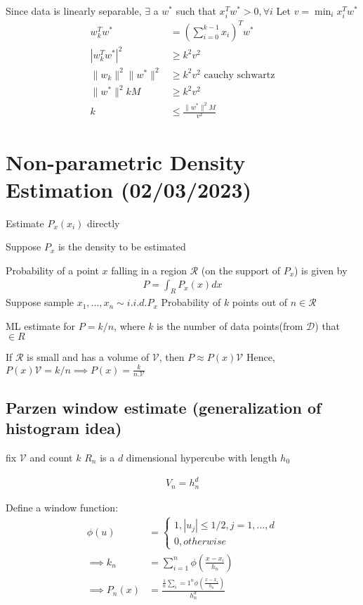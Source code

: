 \documentclass[11pt]{article}
\begin{document}
Since data is linearly separable, \(\exists\) a \(w^{*}\) such that \(x_i^Tw^{*} > 0, \forall i\)
Let \(v = \min_i x_i^T w^{*}\)
\begin{align*}
  w_k^T w^{*} &= \left( \sum_{i=0}^{k-1} x_i \right)^T w^{*} \\
  |w_k^T w^{*}|^2 &\geq k^2v^2 \\
  \lVert w_k \rVert^2 \lVert w^{*} \rVert^2 &\geq k^2v^2 \text{ cauchy schwartz} \\
  \lVert w^{*} \rVert^2 kM &\geq k^2v^2 \\
  k &\leq \frac{\lVert w^{*} \rVert^2 M}{v^2}
\end{align*}
\section{Non-parametric Density Estimation (02/03/2023)}
\label{sec:org447d7a9}

Estimate \(P_x(x_i)\) directly

Suppose \(P_x\) is the density to be estimated

Probability of a point \(x\) falling in a region \(\mathcal{R}\) (on the support of \(P_x\)) is given by
\begin{align*}
P = \int_R P_x(x) dx
\end{align*}
Suppose sample \(x_1, ..., x_n \sim i.i.d. P_x\)
Probability of \(k\) points out of \(n \in \mathcal{R}\)

ML estimate for \(P = k/n\), where \(k\) is the number of data points(from \(\mathcal{D}\)) that \(\in R\)

If \(\mathcal{R}\) is small and has a volume of \(\mathcal{V}\), then \(P \approx P(x)\mathcal{V}\)
Hence, \(P(x)\mathcal{V} = k/n \implies P(x) = \frac{k}{n.\mathcal{V}}\)

\subsection{Parzen window estimate (generalization of histogram idea)}
\label{sec:org6b492fe}
fix \(\mathcal{V}\) and count \(k\)
\(R_n\) is a \(d\) dimensional hypercube with length \(h_0\)

\begin{align*}
  V_n = h_n^d
\end{align*}

Define a window function:
\begin{align*}
  \phi(u) &= \begin{cases} 1, |u_j| \leq 1/2, j=1,...,d \\ 0, otherwise \end{cases} \\
  \implies k_n &= \sum_{i=1}^n \phi \left( \frac{x-x_i}{h_n} \right) \\
  \implies P_n(x) &= \frac{\frac{1}{n} \sum_i=1^n \phi \left( \frac{x - x_i}{h_n} \right)}{h_n^d}
\end{align*}
\end{document}
